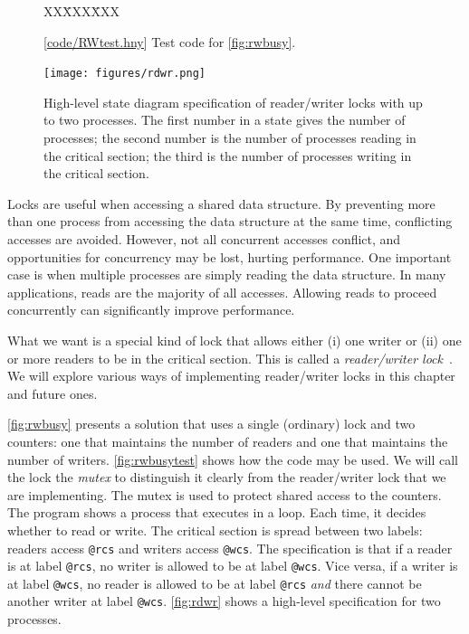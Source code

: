 \documentclass{report}
\newcommand{\harmonysource}[1]{
\begin{tabbing}
XX\=XXX\=XXX\kill
    
\end{tabbing}
}
\newcommand{\harmonylink}[1]{%
[\href{https://www.cs.cornell.edu/home/rvr/harmony/#1}{\underline{#1}}]%
}
\newenvironment{code}{
\tcolorbox
}{
\endtcolorbox
}
\begin{document}
\begin{figure}
\begin{code}
\harmonysource{RWtest}
\end{code}
\caption{\harmonylink{code/RWtest.hny} Test code for \autoref{fig:rwbusy}.}
\label{fig:rwbusytest}
\end{figure}

\begin{figure}
\begin{center}
\texttt{[image: figures/rdwr.png]}
\end{center}
\caption{High-level state diagram specification of reader/writer locks with
up to two processes.
The first number in a state gives the number of processes; the second number is the
number of processes reading in the critical section; the third is the number of
processes writing in the critical section.}
\label{fig:rdwr}
\end{figure}

Locks are useful when accessing a shared data structure.  By preventing
more than one process from accessing the data structure at the same
time, conflicting accesses are avoided.  However, not all concurrent
accesses conflict, and opportunities for concurrency may be lost,
hurting performance.  One important case is when multiple processes
are simply reading the data structure.
In many applications, reads are the majority of all accesses.
Allowing reads to proceed concurrently can significantly improve performance.

What we want is a special kind of lock that allows either (i) one writer
or (ii) one or more readers to be in the critical section.  This is called
a \emph{reader/writer lock}~\cite{CHP71}.
We will explore various ways of implementing reader/writer locks in
this chapter and future ones.

\autoref{fig:rwbusy} presents a solution that uses a
single (ordinary) lock and two counters: one that maintains the number
of readers and one that maintains the number of writers.
\autoref{fig:rwbusytest} shows how the code may be used.
We will call the lock the \emph{mutex} to distinguish it clearly from
the reader/writer lock that we are implementing.
The mutex is used to protect shared access to the counters.
The program shows a process that executes in a loop.
Each time, it decides whether to read or write.
The critical section is spread between two labels:
readers access \texttt{@rcs} and writers access \texttt{@wcs}.
The specification is that if a reader is at label \texttt{@rcs},
no writer is allowed to be at label \texttt{@wcs}.  Vice versa, if
a writer is at label \texttt{@wcs}, no reader is allowed to be at
label \texttt{@rcs} \emph{and} there cannot be another writer at
label \texttt{@wcs}.  \autoref{fig:rdwr} shows a high-level
specification for two processes.
\end{document}
